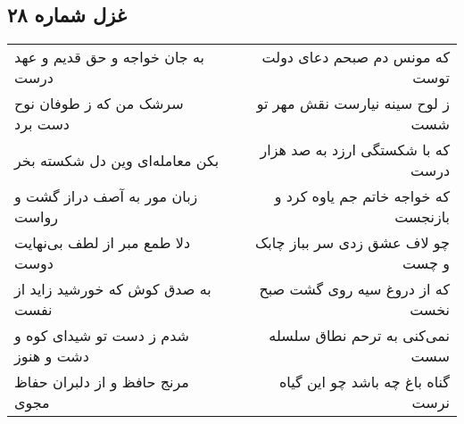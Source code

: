 \begin{center}
\section*{غزل شماره ۲۸}
\label{sec:sh028}
\begin{longtable}{l p{0.5cm} r}
به جان خواجه و حق قدیم و عهد درست
&&
که مونس دم صبحم دعای دولت توست
\\
سرشک من که ز طوفان نوح دست برد
&&
ز لوح سینه نیارست نقش مهر تو شست
\\
بکن معامله‌ای وین دل شکسته بخر
&&
که با شکستگی ارزد به صد هزار درست
\\
زبان مور به آصف دراز گشت و رواست
&&
که خواجه خاتم جم یاوه کرد و بازنجست
\\
دلا طمع مبر از لطف بی‌نهایت دوست
&&
چو لاف عشق زدی سر بباز چابک و چست
\\
به صدق کوش که خورشید زاید از نفست
&&
که از دروغ سیه روی گشت صبح نخست
\\
شدم ز دست تو شیدای کوه و دشت و هنوز
&&
نمی‌کنی به ترحم نطاق سلسله سست
\\
مرنج حافظ و از دلبران حفاظ مجوی
&&
گناه باغ چه باشد چو این گیاه نرست
\\
\end{longtable}
\end{center}
